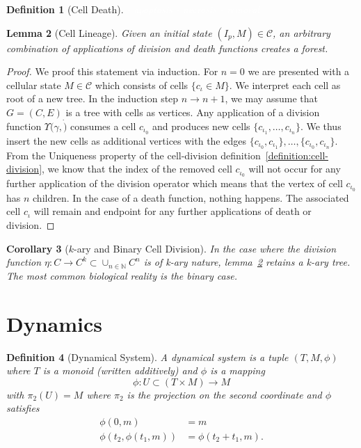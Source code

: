 \documentclass{article}
\newcommand{\todo}[1]{\colorbox{WildStrawberry}{\textcolor{white}{#1}}}
\newtheorem{definition}{Definition}[section]
\newtheorem{lemma}[definition]{Lemma}
\newtheorem{corollary}[definition]{Corollary}
\begin{document}
\begin{definition}[Cell Death]
\todo{
    - apoptosis
    - necrosis
    - removal
}
\end{definition}

\begin{lemma}[Cell Lineage]
    \label{lemma:cell-lineage}
    Given an initial state $(I_p,M)\in\mathscr{C}$, an arbitrary combination of applications of
    division and death functions creates a forest.
\end{lemma}
\begin{proof}
    We proof this statement via induction. For $n=0$ we are presented with a cellular state
    $M\in\mathscr{C}$ which consists of cells $\{c_\iota\in M\}$.
    We interpret each cell as root of a new tree.
    In the induction step $n\rightarrow n+1$, we may assume that $G=(C,E)$ is a tree with
    cells as vertices.
    Any application of a division function $\Upsilon(\gamma, \dot)$ consumes a cell $c_{\iota_0}$
    and produces new cells $\{c_{\iota_1},\dots,c_{\iota_n}\}$.
    We thus insert the new cells as additional vertices with the edges
    $\{c_{\iota_0},c_{\iota_1}\},\dots,\{c_{\iota_0},c_{\iota_n}\}$.
    From the Uniqueness property of the cell-division definition~\ref{definition:cell-division},
    we know that the index of the removed cell $c_{\iota_0}$ will not occur for any further
    application of the division operator which means that the vertex of cell $c_{\iota_0}$ has $n$
    children.
    In the case of a death function, nothing happens.
    The associated cell $c_\iota$ will remain and endpoint for any further applications of death
    or division.
\end{proof}
\begin{corollary}[$k$-ary and Binary Cell Division]
    In the case where the division function $\eta:C\rightarrow C^k\subset\cup_{n\in\mathbb{N}}C^n$
    is of k-ary nature, lemma~\ref{lemma:cell-lineage} retains a k-ary tree.
    The most common biological reality is the binary case.
\end{corollary}

\section{Dynamics}
\label{section:dynamics}
\begin{definition}[Dynamical System]
    A dynamical system is a tuple $(T,M,\phi)$ where $T$ is a monoid (written additively) and
    $\phi$ is a mapping
    \begin{equation}
        \phi : U\subset(T\times M) \rightarrow M
    \end{equation}
    with $\pi_2(U) = M$ where $\pi_2$ is the projection on the second coordinate and $\phi$
    satisfies
    \begin{align}
        \phi(0,m) &= m\\
        \phi(t_2, \phi(t_1, m)) &= \phi(t_2+t_1,m).
    \end{align}
\end{definition}
\end{document}
